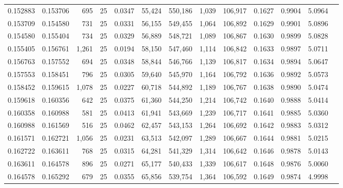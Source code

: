 \begin{tabular}{rrrrrrrrrrrrr}
0.152883 & 0.153706 &   695 &  25 &                                     0.0347 &  55,424 & 550,186 &   1,039 & 106,917 & 0.1627 & 0.9904 & 5.0964 \\
0.153709 & 0.154580 &   731 &  25 &                                     0.0331 &  56,155 & 549,455 &   1,064 & 106,892 & 0.1629 & 0.9901 & 5.0896 \\
0.154580 & 0.155404 &   734 &  25 &                                     0.0329 &  56,889 & 548,721 &   1,089 & 106,867 & 0.1630 & 0.9899 & 5.0828 \\
0.155405 & 0.156761 & 1,261 &  25 &                                     0.0194 &  58,150 & 547,460 &   1,114 & 106,842 & 0.1633 & 0.9897 & 5.0711 \\
0.156763 & 0.157552 &   694 &  25 &                                     0.0348 &  58,844 & 546,766 &   1,139 & 106,817 & 0.1634 & 0.9894 & 5.0647 \\
0.157553 & 0.158451 &   796 &  25 &                                     0.0305 &  59,640 & 545,970 &   1,164 & 106,792 & 0.1636 & 0.9892 & 5.0573 \\
0.158452 & 0.159615 & 1,078 &  25 &                                     0.0227 &  60,718 & 544,892 &   1,189 & 106,767 & 0.1638 & 0.9890 & 5.0474 \\
0.159618 & 0.160356 &   642 &  25 &                                     0.0375 &  61,360 & 544,250 &   1,214 & 106,742 & 0.1640 & 0.9888 & 5.0414 \\
0.160358 & 0.160988 &   581 &  25 &                                     0.0413 &  61,941 & 543,669 &   1,239 & 106,717 & 0.1641 & 0.9885 & 5.0360 \\
0.160988 & 0.161569 &   516 &  25 &                                     0.0462 &  62,457 & 543,153 &   1,264 & 106,692 & 0.1642 & 0.9883 & 5.0312 \\
0.161571 & 0.162721 & 1,056 &  25 &                                     0.0231 &  63,513 & 542,097 &   1,289 & 106,667 & 0.1644 & 0.9881 & 5.0215 \\
0.162722 & 0.163611 &   768 &  25 &                                     0.0315 &  64,281 & 541,329 &   1,314 & 106,642 & 0.1646 & 0.9878 & 5.0143 \\
0.163611 & 0.164578 &   896 &  25 &                                     0.0271 &  65,177 & 540,433 &   1,339 & 106,617 & 0.1648 & 0.9876 & 5.0060 \\
0.164578 & 0.165292 &   679 &  25 &                                     0.0355 &  65,856 & 539,754 &   1,364 & 106,592 & 0.1649 & 0.9874 & 4.9998 \\

\end{tabular}
